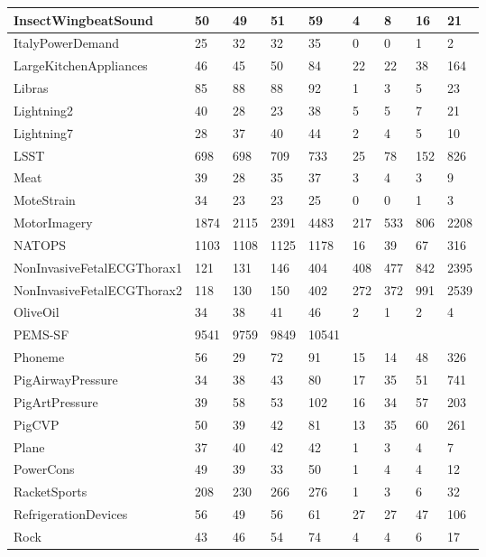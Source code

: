 \begin{landscape}
\begin{longtable}{|l|llll|llll|}
      InsectWingbeatSound & 50 & 49 & 51 & 59 & 4 & 8 & 16 & 21 \\ \hline
      ItalyPowerDemand & 25 & 32 & 32 & 35 & 0 & 0 & 1 & 2 \\ \hline
      LargeKitchenAppliances & 46 & 45 & 50 & 84 & 22 & 22 & 38 & 164 \\ \hline
      Libras & 85 & 88 & 88 & 92 & 1 & 3 & 5 & 23 \\ \hline
      Lightning2 & 40 & 28 & 23 & 38 & 5 & 5 & 7 & 21 \\ \hline
      Lightning7 & 28 & 37 & 40 & 44 & 2 & 4 & 5 & 10 \\ \hline
      LSST & 698 & 698 & 709 & 733 & 25 & 78 & 152 & 826 \\ \hline
      Meat & 39 & 28 & 35 & 37 & 3 & 4 & 3 & 9 \\ \hline
      MoteStrain & 34 & 23 & 23 & 25 & 0 & 0 & 1 & 3 \\ \hline
      MotorImagery & 1874 & 2115 & 2391 & 4483 & 217 & 533 & 806 & 2208 \\ \hline
      NATOPS & 1103 & 1108 & 1125 & 1178 & 16 & 39 & 67 & 316 \\ \hline
      NonInvasiveFetalECGThorax1 & 121 & 131 & 146 & 404 & 408 & 477 & 842 & 2395 \\ \hline
      NonInvasiveFetalECGThorax2 & 118 & 130 & 150 & 402 & 272 & 372 & 991 & 2539 \\ \hline
      OliveOil & 34 & 38 & 41 & 46 & 2 & 1 & 2 & 4 \\ \hline
      PEMS-SF & 9541 & 9759 & 9849 & 10541 &  &  &  &  \\ \hline
      Phoneme & 56 & 29 & 72 & 91 & 15 & 14 & 48 & 326 \\ \hline
      PigAirwayPressure & 34 & 38 & 43 & 80 & 17 & 35 & 51 & 741 \\ \hline
      PigArtPressure & 39 & 58 & 53 & 102 & 16 & 34 & 57 & 203 \\ \hline
      PigCVP & 50 & 39 & 42 & 81 & 13 & 35 & 60 & 261 \\ \hline
      Plane & 37 & 40 & 42 & 42 & 1 & 3 & 4 & 7 \\ \hline
      PowerCons & 49 & 39 & 33 & 50 & 1 & 4 & 4 & 12 \\ \hline
      RacketSports & 208 & 230 & 266 & 276 & 1 & 3 & 6 & 32 \\ \hline
      RefrigerationDevices & 56 & 49 & 56 & 61 & 27 & 27 & 47 & 106 \\ \hline
      Rock & 43 & 46 & 54 & 74 & 4 & 4 & 6 & 17 \\ \hline

\end{longtable}
\end{landscape}
